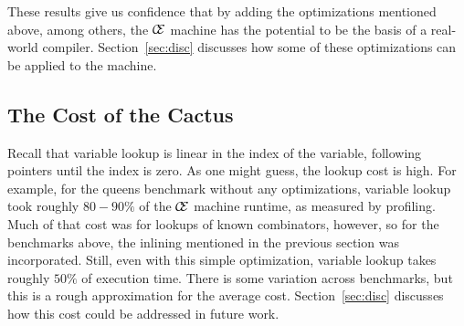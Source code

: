 These results give us confidence that by adding the optimizations mentioned
above, among others, the $\mathcal{\mathcal{C} \mskip -4mu \mathcal{E}}$ machine has the potential to be the
basis of a real-world compiler. Section~\ref{sec:disc} discusses how some of
these optimizations can be applied to the \ce machine.

\subsection{The Cost of the Cactus}

Recall that variable lookup is linear in the index of the variable, following
pointers until the index is zero. As one might guess, the lookup cost is high.
For example, for the queens benchmark without any optimizations, variable lookup
took roughly $80-90\%$ of the $\mathcal{\mathcal{C} \mskip -4mu \mathcal{E}}$ machine runtime, as measured
by profiling. Much of that cost was for lookups of known combinators, however,
so for the benchmarks above, the inlining mentioned in the previous section was
incorporated. Still, even with this simple optimization, variable lookup takes
roughly $50\%$ of execution time. There is some variation across benchmarks, but
this is a rough approximation for the average cost. Section~\ref{sec:disc}
discusses how this cost could be addressed in future work.


